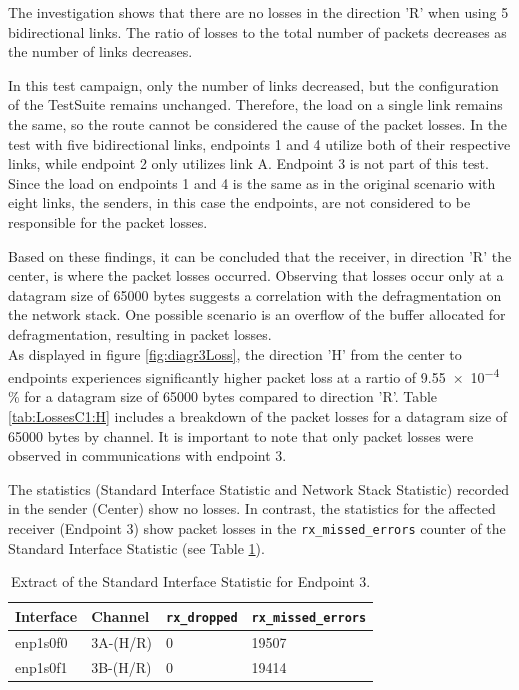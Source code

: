 The investigation shows that there are no losses in the direction 'R' when using 5 bidirectional links. The ratio of losses to the total number of packets decreases as the number of links decreases.

In this test campaign, only the number of links decreased, but the configuration of the TestSuite remains unchanged. Therefore, the load on a single link remains the same, so the route cannot be considered the cause of the packet losses. In the test with five bidirectional links, endpoints 1 and 4 utilize both of their respective links, while endpoint 2 only utilizes link A. Endpoint 3 is not part of this test. Since the load on endpoints 1 and 4 is the same as in the original scenario with eight links, the senders, in this case the endpoints, are not considered to be responsible for the packet losses.

Based on these findings, it can be concluded that the receiver, in direction 'R' the center, is where the packet losses occurred. Observing that losses occur only at a datagram size of 65000 bytes suggests a correlation with the defragmentation on the network stack. One possible scenario is an overflow of the buffer allocated for defragmentation, resulting in packet losses. \\


As displayed in figure \ref{fig:diagr3Loss}, the direction 'H' from the center to endpoints experiences significantly higher packet loss at a rartio of \num{9.55e-4} \% for a datagram size of 65000 bytes compared to direction 'R'. Table \ref{tab:LossesC1:H} includes a breakdown of the packet losses for a datagram size of 65000 bytes by channel. It is important to note that only packet losses were observed in communications with endpoint 3.

The statistics (Standard Interface Statistic and Network Stack Statistic) recorded in the sender (Center) show no losses. In contrast, the statistics for the affected receiver (Endpoint 3) show packet losses in the \texttt{rx\_missed\_errors} counter of the Standard Interface Statistic (see Table \ref{tab:ep3InterfaceStat}).

\begin{table}[h]
\centering
\begin{tabular}{llll}
	\toprule
	Interface & Channel & \texttt{rx\_dropped} & \texttt{rx\_missed\_errors} \\
	\midrule
 	enp1s0f0 & 3A-(H/R) & 0 & 19507 \\ 
 	enp1s0f1 & 3B-(H/R) & 0 & 19414 \\
	\bottomrule
\end{tabular}
\caption{Extract of the Standard Interface Statistic for Endpoint 3.}
\label{tab:ep3InterfaceStat}
\end{table}

